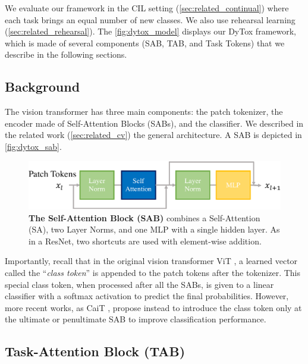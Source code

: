 We evaluate our framework in the \acf{CIL} setting (\autoref{sec:related_continual}) where each task
brings an equal number of new classes. We also use rehearsal learning
(\autoref{sec:related_rehearsal}). The \autoref{fig:dytox_model} displays our DyTox framework, which
is made of several components (SAB, TAB, and Task Tokens) that we describe in the following
sections.

\subsection{Background}
\label{sec:dytox_vit}

The vision transformer \citep{dosovitskiy2020vit} has three main components: the patch tokenizer, the
encoder made of Self-Attention Blocks (SABs), and the classifier. We described in the related work
(\autoref{sec:related_cv}) the general architecture. A SAB is depicted in \autoref{fig:dytox_sab}.

\begin{figure}
    \centering
    \includegraphics[width=1\textwidth]{images/dytox/sab.pdf}
    \caption{\textbf{The Self-Attention Block (SAB)} combines a Self-Attention (SA), two Layer
        Norms, and one MLP with a single hidden layer. As in a ResNet, two shortcuts are used with
        element-wise addition.}
    \label{fig:dytox_sab}
\end{figure}

Importantly, recall that in the original vision transformer ViT \citep{dosovitskiy2020vit}, a learned
vector called the ``\textit{class token}'' is appended to the patch tokens after the tokenizer. This
special class token, when processed after all the SABs, is given to a linear classifier with a
softmax activation to predict the final probabilities. However, more recent works, as CaiT
\citep{touvron2021cait}, propose instead to introduce the class token only at the ultimate or
penultimate SAB to improve classification performance.

\subsection{Task-Attention Block (TAB)}
\label{sec:dytox_tab}

